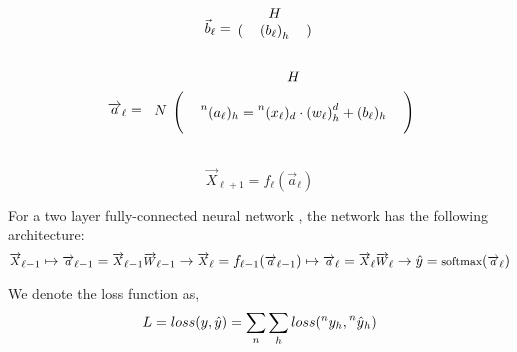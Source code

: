 \documentclass[12pt,a4paper]{article}%
\theoremstyle{definition}
\theoremstyle{plain}
\numberwithin{equation}{section}
\newcounter{subsubsubsection}[subsubsection]
\begin{document}
\begin{equation*}
\vec{b}_{\ell} =  \begin{blockarray}{ccc}
    \multicolumn{3}{c}{$H$}  \\
\begin{block}{(ccc)}
    &    {(b_{\ell})}_{h}     &    \\
\end{block}
\end{blockarray}
\end{equation*}

\begin{equation*}
\overrightarrow{a}_{\ell} =  \begin{blockarray}{cccc}
                                     & \multicolumn{3}{c}{$H$}  \\
\begin{block}{c(ccc)}
\multirow{3}{*}{$N$} &    &       &    \\
  					                 &      & \prescript{n}{}{(a_{\ell})}_{h} =  \prescript{n}{}{(x_{\ell})}_{d} \cdot {(w_{\ell})}^{d}_{h}  + (b_{\ell})_{h}    &     \\
			     	                 &      &       &       \\
\end{block}
\end{blockarray}
\end{equation*}

\begin{equation}
\overrightarrow{X}_{\ell+1} = f_{\ell}(\overrightarrow{a}_{\ell} )
\end{equation}


For a two layer fully-connected neural network ,  the network has the following architecture: 
\begin{equation}
\footnotesize
\overrightarrow{X}_{\ell-1} \mapsto \overrightarrow{a}_{\ell-1} = \overrightarrow{X}_{\ell-1} \overrightarrow{W}_{\ell-1} \rightarrow 
\overrightarrow{X}_{\ell} = f_{\ell-1}(\overrightarrow{a}_{\ell-1}) \mapsto \overrightarrow{a}_{\ell} = \overrightarrow{X}_{\ell} \overrightarrow{W}_{\ell} \rightarrow \hat{y} = \text{softmax}(\overrightarrow{a}_{\ell})
\end{equation}

We denote the loss function as,
\begin{equation}
L = loss(y, \hat{y}) = \sum\limits_{n} \sum\limits_{h} loss(\prescript{n}{}{y_{h}}, \prescript{n}{}{\hat{y}}_{h})
\end{equation}
\end{document}
